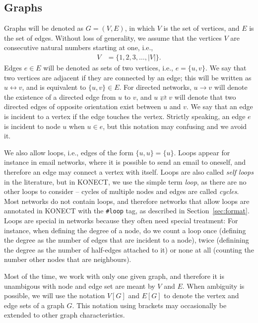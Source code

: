 \documentclass{article}
\begin{document}
\subsection{Graphs}
Graphs will be denoted as $G=(V,E)$, in which $V$ is the set of
vertices, and $E$ is the set of edges. Without loss of
generality, we assume that the vertices $V$ are consecutive natural
numbers starting at one, i.e.,
\begin{align}
  V &= \{ 1, 2, 3, \dotsc, |V| \}.
\end{align}
Edges $e\in E$ will be denoted as sets of two vertices, i.e.,
$e=\{u,v\}$.  We say that two vertices are adjacent if they are
connected by an edge; this will be written as $u \leftrightarrow v$, and is equivalent to $\{u,v\}\in E$. 
For directed networks, $u \rightarrow v$ will denote the existence of a
directed edge from $u$ to $v$, and $u \rightleftarrows v$ will denote
that two directed edges of opposite orientation exist between $u$ and $v$.
We say that an
edge is incident to a vertex if the edge touches the vertex. Strictly
speaking, an edge $e$ is incident to node $u$ when $u\in e$, but this
notation may confusing and we avoid it. 

We also allow loops, i.e., edges of the form $\{u,u\}=\{u\}$.  Loops
appear for instance in email networks, where it is possible to send an
email to oneself, and therefore an edge may connect a vertex with
itself.  Loops are also called \emph{self loops} in the literature, but
in KONECT, we use the simple term \emph{loop}, as there are no other
loops to consider -- cycles of multiple nodes and edges are called
\emph{cycles}. 
Most networks do not contain loops, and therefore
networks that allow loops are annotated in KONECT with the 
\texttt{\#loop} tag, as described in Section~\ref{sec:format}.  
Loops are special in networks because they often need special treatment:
For instance, when defining the degree of a node, do we count a loop
once (defining the degree as the number of edges that are incident to a
node), twice (definining the degree as the number of half-edges attached
to it) or none at all (counting the number other nodes that are
neighbours).  

Most of the time, we work with only one given graph, and therefore it is
unambigous with node and edge set are meant by $V$ and $E$.  When
ambiguity is possible, we will use the notation
$V[G]$ and $E[G]$ to denote the vertex and edge sets of a graph $G$.
This notation using brackets may occasionally be extended to other graph
characteristics. 
\end{document}
